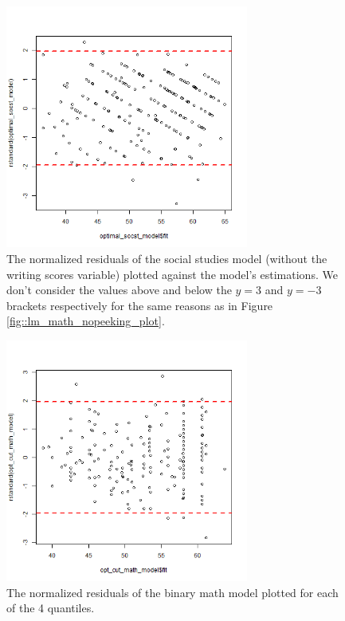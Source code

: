\documentclass[10pt, a4paper]{article}
\begin{document}
	 \begin{figure}
	 	\includegraphics[width=8cm]{lm_socst_residual_plot.png}
	 	\centering
	 	\caption{The normalized residuals of the social studies model (without the writing scores variable) plotted against the model's estimations. We don't consider the values above and below the $y=3$ and $y=-3$ brackets respectively for the same reasons as in Figure \ref{fig::lm_math_nopeeking_plot}.}
	 	\label{fig::lm_sosct_nopeeking_plot}
	 \end{figure}
 
	 \begin{figure}
	 	\includegraphics[width=8cm]{lm_math_binary_outlier_plot.png}
	 	\centering
	 	\caption{The normalized residuals of the binary math model plotted for each of the 4 quantiles.}
	 	\label{fig::lm_cut_math_outlier}
	 \end{figure}
	
\end{document}
